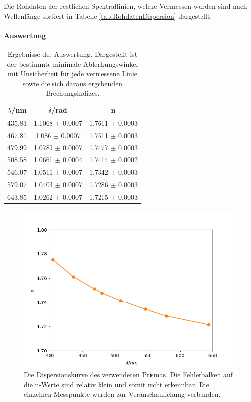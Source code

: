 \documentclass[12pt,a4paper]{article}
\begin{document}
	
	Die Rohdaten der restlichen Spektrallinien, welche Vermessen wurden sind nach Wellenlänge sortiert in Tabelle \ref{tab:RohdatenDispersion} dargestellt.
	
	
	\paragraph{Auswertung}
	
	\begin{table}
		\begin{center}
			\begin{tabular}{|c|c|c|}
				\hline
				$\lambda$/nm & $\delta$/rad & n \\
				\hline
				435.83 & 1.1068 $\pm$ 0.0007 & 1.7611 $\pm$ 0.0003 \\ 
				\hline
				467.81 & 1.086 $\pm$ 0.0007 & 1.7511 $\pm$ 0.0003 \\
				\hline
				479.99 & 1.0789 $\pm$ 0.0007 & 1.7477 $\pm$ 0.0003 \\
				\hline
				508.58 & 1.0661 $\pm$ 0.0004 & 1.7414 $\pm$ 0.0002 \\
				\hline
				546.07 & 1.0516 $\pm$ 0.0007 & 1.7342 $\pm$ 0.0003 \\
				\hline
				579.07 & 1.0403 $\pm$ 0.0007 & 1.7286 $\pm$ 0.0003 \\
				\hline
				643.85 & 1.0262 $\pm$ 0.0007 & 1.7215 $\pm$ 0.0003 \\ 
				\hline
			\end{tabular}
			\caption{Ergebnisse der Auswertung. Dargestellt ist der bestimmte minimale Ablenkungswinkel mit Unsicherheit für jede vermessene Linie sowie die sich daraus ergebenden Brechungsindizes.}
			\label{tab:AuswertungDispersion}
		\end{center}
	\end{table}
	
	\begin{figure}
		\centering
		\includegraphics[scale=0.88]{Bilder/Dispersionskurve.png}
		\caption{Die Dispersionskurve des verwendeten Prismas. Die Fehlerbalken auf die n-Werte sind relativ klein und somit nicht erkennbar. Die einzelnen Messpunkte wurden zur Veranschaulichung verbunden.}\label{fig:Dispersionskurve}
	\end{figure}
	
\end{document}
